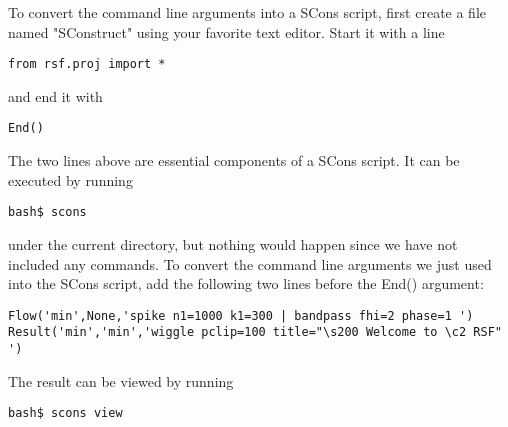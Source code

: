 To convert the command line arguments into a SCons script, first
create a file named "SConstruct" using your favorite text
editor. Start it with a line
\begin{verbatim}
from rsf.proj import *
\end{verbatim}
and end it with
\begin{verbatim}
End() 
\end{verbatim}
The two lines above are essential components of a SCons script. It can
be executed by running
\begin{verbatim}
bash$ scons
\end{verbatim}
under the current directory, but nothing would happen since we have
not included any commands. To convert the command line arguments we
just used into the SCons script, add the following two lines before the
End() argument:
\begin{verbatim}
Flow('min',None,'spike n1=1000 k1=300 | bandpass fhi=2 phase=1 ')
Result('min','min','wiggle pclip=100 title="\s200 Welcome to \c2 RSF" ')
\end{verbatim}
The result can be viewed by running
\begin{verbatim}
bash$ scons view
\end{verbatim}


